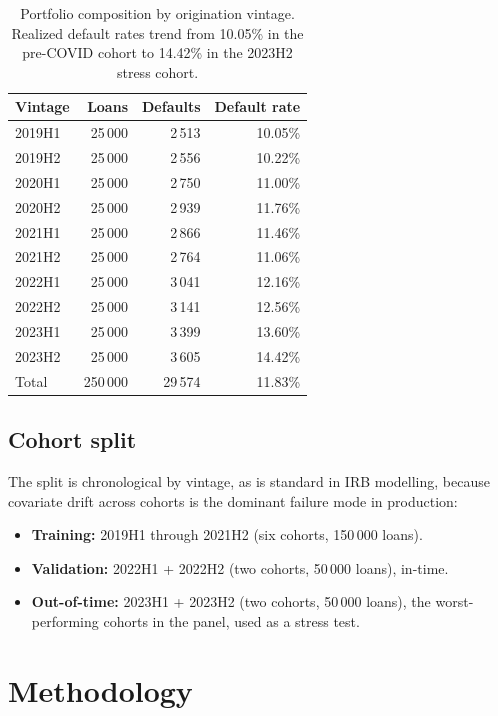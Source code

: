 \documentclass[a4paper,11pt]{article}
\begin{document}
\begin{table}[H]
\centering
\begin{tabular}{l r r r}
\toprule
\textbf{Vintage} & \textbf{Loans} & \textbf{Defaults} & \textbf{Default rate} \\
\midrule
2019H1 & 25\,000 & 2\,513 & 10.05\% \\
2019H2 & 25\,000 & 2\,556 & 10.22\% \\
2020H1 & 25\,000 & 2\,750 & 11.00\% \\
2020H2 & 25\,000 & 2\,939 & 11.76\% \\
2021H1 & 25\,000 & 2\,866 & 11.46\% \\
2021H2 & 25\,000 & 2\,764 & 11.06\% \\
2022H1 & 25\,000 & 3\,041 & 12.16\% \\
2022H2 & 25\,000 & 3\,141 & 12.56\% \\
2023H1 & 25\,000 & 3\,399 & 13.60\% \\
2023H2 & 25\,000 & 3\,605 & 14.42\% \\
\midrule
Total  & 250\,000 & 29\,574 & 11.83\% \\
\bottomrule
\end{tabular}
\caption{Portfolio composition by origination vintage. Realized default rates trend from 10.05\% in the pre-COVID cohort to 14.42\% in the 2023H2 stress cohort.}
\end{table}

\subsection{Cohort split}

The split is chronological by vintage, as is standard in IRB modelling,
because covariate drift across cohorts is the dominant failure mode in
production:

\begin{itemize}
\item \textbf{Training:} 2019H1 through 2021H2 (six cohorts, 150\,000 loans).
\item \textbf{Validation:} 2022H1 + 2022H2 (two cohorts, 50\,000 loans), in-time.
\item \textbf{Out-of-time:} 2023H1 + 2023H2 (two cohorts, 50\,000 loans), the
worst-performing cohorts in the panel, used as a stress test.
\end{itemize}

\section{Methodology}
\end{document}
